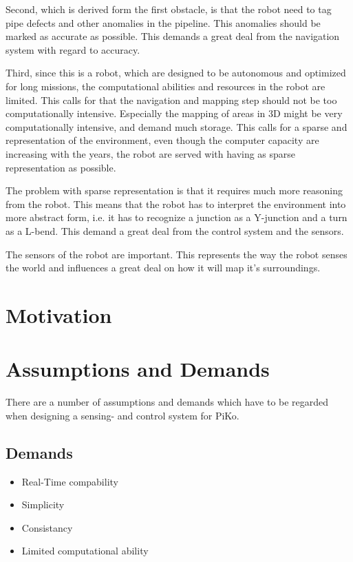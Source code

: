 Second, which is derived form the first obstacle, is that the robot need to tag pipe
defects and other anomalies in the pipeline. This anomalies should be marked as accurate
as possible. This demands a great deal from the navigation system with regard to accuracy. 

Third, since this is a robot, which are designed to be autonomous and optimized for long
missions, the computational abilities and resources in the robot are limited. This calls
for that the navigation and mapping step should not be too computationally intensive.
Especially the mapping of areas in 3D might be very computationally intensive, and demand
much storage. This calls for a sparse and representation of the environment, even though
the computer capacity are increasing with the years, the robot are served with having as
sparse representation as possible. 

The problem with sparse representation is that it requires much more reasoning from the 
robot. This means that the robot has to interpret the environment into more abstract form,
i.e. it has to recognize a junction as a Y-junction and a turn as a L-bend. This demand a
great deal from the control system and the sensors. 

The sensors of the robot are important. This represents the way the robot senses the world
and influences a great deal on how it will map it's surroundings. 


\section{Motivation}


\section{Assumptions and Demands}
There are a number of assumptions and demands which have to be regarded when designing a
sensing- and control system for PiKo. 

\subsection{Demands}
\begin{itemize}
    \item Real-Time compability
    \item Simplicity
    \item Consistancy
    \item Limited computational ability
\end{itemize}


